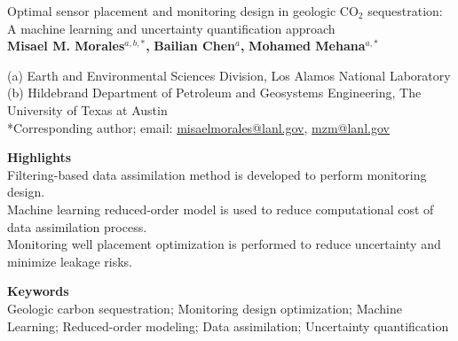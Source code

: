 \documentclass[10pt, twoside]{article}
\begin{document}
\doublespacing

\begin{center}
    {\huge Optimal sensor placement and monitoring design in geologic CO$_2$ sequestration: A machine learning and uncertainty quantification approach}
    \vspace{5mm}\\
    \textbf{Misael M. Morales$^{a,b,*}$,} \textbf{Bailian Chen$^{a}$,} \textbf{Mohamed Mehana$^{a,*}$} 
\end{center}

\begin{flushleft}
(a) Earth and Environmental Sciences Division, Los Alamos National Laboratory \\
(b) Hildebrand Department of Petroleum and Geosystems Engineering, The University of Texas at Austin \\
*Corresponding author; email: \url{misaelmorales@lanl.gov}, \url{mzm@lanl.gov}
\end{flushleft}

\textbf{Highlights} \\
Filtering-based data assimilation method is developed to perform monitoring design.\\
Machine learning reduced-order model is used to reduce computational cost of data assimilation process.\\
Monitoring well placement optimization is performed to reduce uncertainty and minimize leakage risks.

\textbf{Keywords}\\
Geologic carbon sequestration; Monitoring design optimization; Machine Learning; Reduced-order modeling; Data assimilation; Uncertainty quantification

\end{document}
